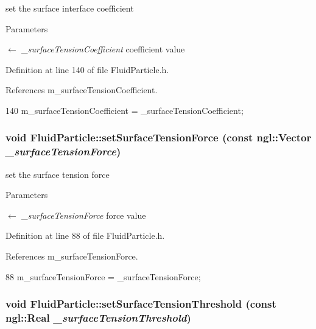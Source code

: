 set the surface interface coefficient 


\begin{DoxyParams}{Parameters}
\item[\mbox{$\leftarrow$} {\em \_\-surfaceTensionCoefficient}]coefficient value \end{DoxyParams}


Definition at line 140 of file FluidParticle.h.



References m\_\-surfaceTensionCoefficient.




\begin{DoxyCode}
140 { m_surfaceTensionCoefficient = _surfaceTensionCoefficient; }
\end{DoxyCode}


\hypertarget{class_fluid_particle_ac7854dc82e9b28d515021a5616973d8b}{
\subsubsection[{setSurfaceTensionForce}]{\setlength{\rightskip}{0pt plus 5cm}void FluidParticle::setSurfaceTensionForce (const ngl::Vector {\em \_\-surfaceTensionForce})}}
\label{class_fluid_particle_ac7854dc82e9b28d515021a5616973d8b}


set the surface tension force 


\begin{DoxyParams}{Parameters}
\item[\mbox{$\leftarrow$} {\em \_\-surfaceTensionForce}]force value \end{DoxyParams}


Definition at line 88 of file FluidParticle.h.



References m\_\-surfaceTensionForce.




\begin{DoxyCode}
88 { m_surfaceTensionForce = _surfaceTensionForce; }
\end{DoxyCode}


\hypertarget{class_fluid_particle_abfcb80bf86d94aa6db5add367f388bcf}{
\subsubsection[{setSurfaceTensionThreshold}]{\setlength{\rightskip}{0pt plus 5cm}void FluidParticle::setSurfaceTensionThreshold (const ngl::Real {\em \_\-surfaceTensionThreshold})}}
\label{class_fluid_particle_abfcb80bf86d94aa6db5add367f388bcf}


